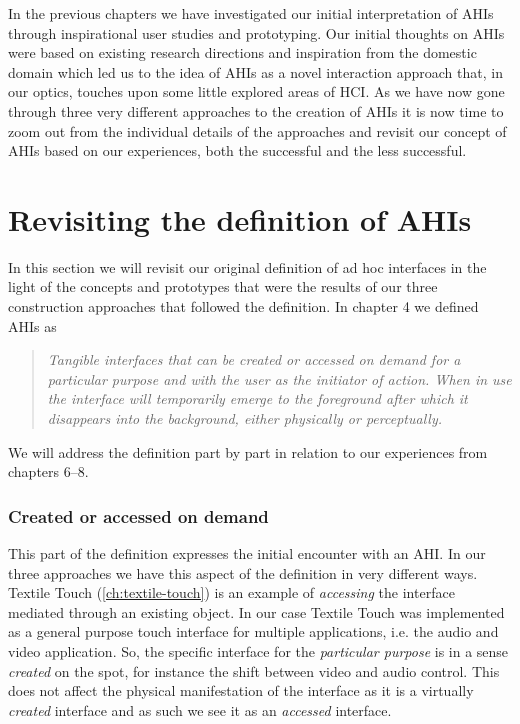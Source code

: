 In the previous chapters we have investigated our initial interpretation of AHIs through inspirational user studies and prototyping.
Our initial thoughts on AHIs were based on existing research directions and inspiration from the domestic domain which led us to the idea of AHIs as a novel interaction approach that, in our optics, touches upon some little explored areas of HCI.  
As we have now gone through three very different approaches to the creation of AHIs it is now time to zoom out from the individual details of the approaches and revisit our concept of AHIs based on our experiences, both the successful and the less successful.

\section{Revisiting the definition of AHIs}
In this section we will revisit our original definition of ad hoc interfaces in the light of the concepts and prototypes that were the results of our three construction approaches that followed the definition.
In chapter 4 we defined AHIs as
\begin{quotation}
\emph{Tangible interfaces that can be created or accessed on demand for a particular purpose and with the user as the initiator of action. When in use the interface will temporarily emerge to the foreground after which it disappears into the background, either physically or perceptually.}
\end{quotation}
We will address the definition part by part in relation to our experiences from chapters 6--8.

\subsubsection{Created or accessed on demand}
This part of the definition expresses the initial encounter with an AHI.
In our three approaches we have  this aspect of the definition in very different ways.
Textile Touch (\autoref{ch:textile-touch}) is an example of \emph{accessing} the interface mediated through an existing object.
In our case Textile Touch was implemented as a general purpose touch interface for multiple applications, i.e. the audio and video application.
So, the specific interface for the \emph{particular purpose} is in a sense \emph{created} on the spot, for instance the shift between video and audio control.
This does not affect the physical manifestation of the interface as it is a virtually \emph{created} interface and as such we see it as an \emph{accessed} interface.

